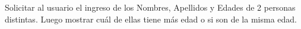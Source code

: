 ﻿
Solicitar al usuario el ingreso de los Nombres, Apellidos y Edades de 2 personas distintas. Luego mostrar cuál de ellas tiene más edad o si son de la misma edad.


\newpage
{}

\volverindice
\newpage
